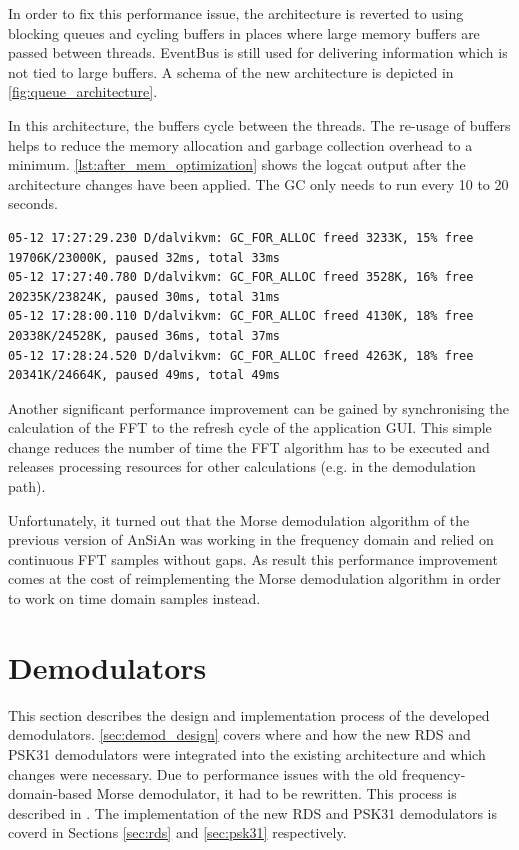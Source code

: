 In order to fix this performance issue, the architecture is reverted
to using blocking queues and cycling buffers in places where large memory buffers are passed
between threads. EventBus is still used for delivering information
which is not tied to large buffers. A schema of the new architecture
is depicted in \autoref{fig:queue_architecture}. 

In this architecture, the buffers cycle between the threads. The re-usage
of buffers helps to reduce the memory allocation and garbage collection
overhead to a minimum. \autoref{lst:after_mem_optimization} shows the
logcat output after the architecture changes have been applied. The \ac{GC}
only needs to run every 10 to 20 seconds.


\begin{lstlisting}[label=lst:after_mem_optimization, caption=Logcat output
after memory optimizations, language=none]
05-12 17:27:29.230 D/dalvikvm: GC_FOR_ALLOC freed 3233K, 15% free 19706K/23000K, paused 32ms, total 33ms
05-12 17:27:40.780 D/dalvikvm: GC_FOR_ALLOC freed 3528K, 16% free 20235K/23824K, paused 30ms, total 31ms
05-12 17:28:00.110 D/dalvikvm: GC_FOR_ALLOC freed 4130K, 18% free 20338K/24528K, paused 36ms, total 37ms
05-12 17:28:24.520 D/dalvikvm: GC_FOR_ALLOC freed 4263K, 18% free 20341K/24664K, paused 49ms, total 49ms
\end{lstlisting}

Another significant performance improvement can be gained by synchronising
the calculation of the \ac{FFT} to the refresh cycle of the application
\ac{GUI}. This simple change reduces the number of time the \ac{FFT} algorithm
has to be executed and releases processing resources for other calculations
(e.g. in the demodulation path). 

Unfortunately, it turned out that the Morse demodulation
algorithm of the previous version of \ac{AnSiAn} was working in the frequency
domain and relied on continuous \ac{FFT} samples without gaps.
As result this performance improvement comes at the cost of reimplementing
the Morse demodulation algorithm in order to work on time domain samples
instead.


\section{Demodulators}

This section describes the design and implementation process of the developed demodulators. \autoref{sec:demod_design} covers where and how the new \ac{RDS} and \ac{PSK31} demodulators were integrated into the existing architecture and which changes were necessary. Due to performance issues with the old frequency-domain-based Morse demodulator, it had to be rewritten. This process is described in \label{sec:morse_demod}. The implementation of the new \ac{RDS} and \ac{PSK31} demodulators is coverd in Sections \ref{sec:rds} and \ref{sec:psk31} respectively.


